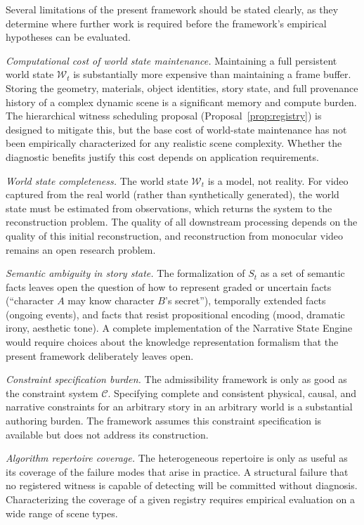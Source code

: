 \documentclass[11pt,a4paper]{article}
\theoremstyle{plain}
\theoremstyle{definition}
\theoremstyle{remark}
\begin{document}
Several limitations of the present framework should be stated clearly, as they determine where further work is required before the framework's empirical hypotheses can be evaluated.

\textit{Computational cost of world state maintenance.} Maintaining a full persistent world state $\mathcal{W}_t$ is substantially more expensive than maintaining a frame buffer. Storing the geometry, materials, object identities, story state, and full provenance history of a complex dynamic scene is a significant memory and compute burden. The hierarchical witness scheduling proposal (Proposal~\ref{prop:registry}) is designed to mitigate this, but the base cost of world-state maintenance has not been empirically characterized for any realistic scene complexity. Whether the diagnostic benefits justify this cost depends on application requirements.

\textit{World state completeness.} The world state $\mathcal{W}_t$ is a model, not reality. For video captured from the real world (rather than synthetically generated), the world state must be estimated from observations, which returns the system to the reconstruction problem. The quality of all downstream processing depends on the quality of this initial reconstruction, and reconstruction from monocular video remains an open research problem.

\textit{Semantic ambiguity in story state.} The formalization of $S_t$ as a set of semantic facts leaves open the question of how to represent graded or uncertain facts (``character $A$ may know character $B$'s secret''), temporally extended facts (ongoing events), and facts that resist propositional encoding (mood, dramatic irony, aesthetic tone). A complete implementation of the Narrative State Engine would require choices about the knowledge representation formalism that the present framework deliberately leaves open.

\textit{Constraint specification burden.} The admissibility framework is only as good as the constraint system $\mathcal{C}$. Specifying complete and consistent physical, causal, and narrative constraints for an arbitrary story in an arbitrary world is a substantial authoring burden. The framework assumes this constraint specification is available but does not address its construction.

\textit{Algorithm repertoire coverage.} The heterogeneous repertoire is only as useful as its coverage of the failure modes that arise in practice. A structural failure that no registered witness is capable of detecting will be committed without diagnosis. Characterizing the coverage of a given registry requires empirical evaluation on a wide range of scene types.
\end{document}
